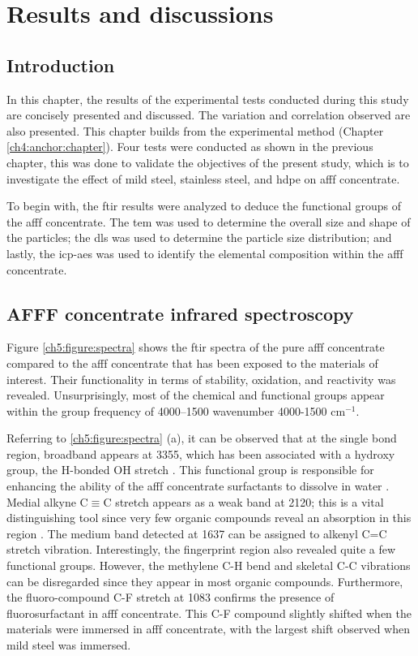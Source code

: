 \chapter{Results and discussions}
\label{ch5:anchor:chapter}
\section{Introduction}
In this chapter, the results of the experimental tests conducted during this study are concisely presented and discussed. The variation and correlation observed are also presented. This chapter builds from the experimental method (Chapter \ref{ch4:anchor:chapter}).  Four tests were conducted as shown in the previous chapter, this was done to validate the objectives of the present study, which is to investigate the effect of mild steel, stainless steel, and \acrshort{hdpe} on \acrshort{afff} concentrate. 

To begin with, the \acrshort{ftir} results were analyzed to deduce the functional groups of the \acrshort{afff} concentrate. The \acrshort{tem} was used to determine the overall size and shape of the particles; the \acrshort{dls} was used to determine the particle size distribution; and lastly, the \acrshort{icp-aes} was used to identify the elemental composition within the \acrshort{afff} concentrate.

\section{AFFF concentrate infrared spectroscopy}
Figure \ref{ch5:figure:spectra} shows the \acrshort{ftir} spectra of the pure \acrshort{afff} concentrate compared to the \acrshort{afff} concentrate that has been exposed to the materials of interest. Their functionality in terms of stability, oxidation, and reactivity was revealed. Unsurprisingly, most of the chemical and functional groups appear within the group frequency of 4000–1500 wavenumber 4000-1500 cm$^{-1}$.

Referring to \ref{ch5:figure:spectra} (a), it can be observed that at the single bond region, broadband appears at 3355, which has been associated with a hydroxy group, the H-bonded OH stretch \cite{krimm1986vibrational}. This functional group is responsible for enhancing the ability of the \acrshort{afff} concentrate surfactants to dissolve in water \cite{coates1996interpretation}.  Medial alkyne C$\equiv$C stretch appears as a weak band at 2120; this is a vital distinguishing tool since very few organic compounds reveal an absorption in this region \cite{bellamy1980infrared}. The medium band detected at 1637 can be assigned to alkenyl C=C stretch vibration. Interestingly, the fingerprint region also revealed quite a few functional groups. However, the methylene C-H bend and skeletal C-C vibrations can be disregarded since they appear in most organic compounds. Furthermore, the fluoro-compound C-F stretch at 1083 confirms the presence of fluorosurfactant in \acrshort{afff} concentrate. This C-F compound slightly shifted when the materials were immersed in \acrshort{afff} concentrate, with the largest shift observed when mild steel was immersed.


